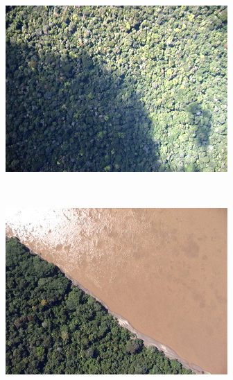 \begin{figure}[h]
  \centering
  \begin{subfigure}[b]{0.3\textwidth}
    \includegraphics[width=\textwidth]{imgs/amostra1}
  \end{subfigure}%
  ~
  \begin{subfigure}[b]{0.3\textwidth}
    \includegraphics[width=\textwidth]{imgs/amostra2}
  \end{subfigure}%
  ~
  \begin{subfigure}[b]{0.3\textwidth}

\end{subfigure}
\end{figure}
